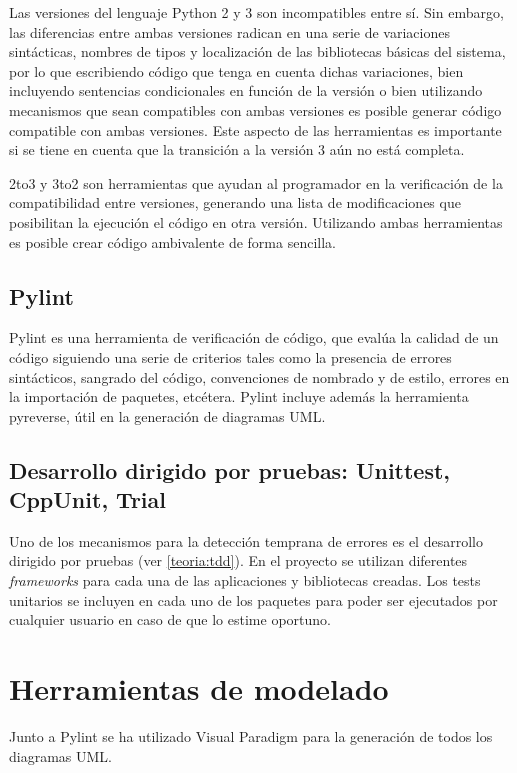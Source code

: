 Las versiones del lenguaje Python 2 y 3 son incompatibles entre sí. Sin embargo, las diferencias entre ambas versiones radican en una serie de variaciones sintácticas, nombres de tipos y localización de las bibliotecas básicas del sistema, por lo que escribiendo código que tenga en cuenta dichas variaciones, bien incluyendo sentencias condicionales en función de la versión o bien utilizando mecanismos que sean compatibles con ambas versiones es posible generar código compatible con ambas versiones. Este aspecto de las herramientas es importante si se tiene en cuenta que la transición a la versión 3 aún no está completa.

2to3 y 3to2 son herramientas que ayudan al programador en la verificación de la compatibilidad entre versiones, generando una lista de modificaciones que posibilitan la ejecución el código en otra versión. Utilizando ambas herramientas es posible crear código ambivalente de forma sencilla.

\subsection{Pylint}

Pylint es una herramienta de verificación de código, que evalúa la calidad de un código siguiendo una serie de criterios tales como la presencia de errores sintácticos, sangrado del código, convenciones de nombrado y de estilo, errores en la importación de paquetes, etcétera. Pylint incluye además la herramienta pyreverse, útil en la generación de diagramas UML.

\subsection{Desarrollo dirigido por pruebas: Unittest, CppUnit, Trial}

Uno de los mecanismos para la detección temprana de errores es el desarrollo dirigido por pruebas (ver \ref{teoria:tdd}). En el proyecto se utilizan diferentes \textit{frameworks} para cada una de las aplicaciones y bibliotecas creadas. Los tests unitarios se incluyen en cada uno de los paquetes para poder ser ejecutados por cualquier usuario en caso de que lo estime oportuno.

\section{Herramientas de modelado}

Junto a Pylint se ha utilizado Visual Paradigm para la generación de todos los diagramas UML.



